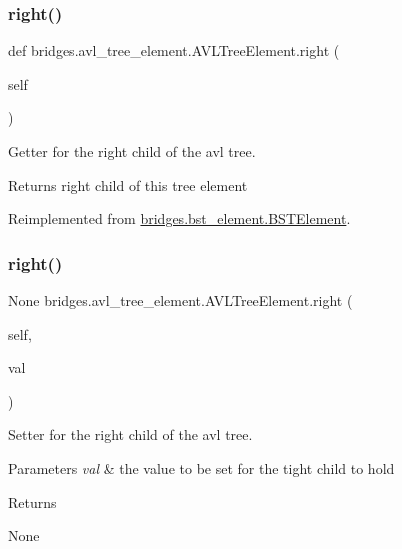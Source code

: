 \subsubsection{\texorpdfstring{right()}{right()}\hspace{0.1cm}{\footnotesize\ttfamily [1/2]}}
{\footnotesize\ttfamily def bridges.\+avl\+\_\+tree\+\_\+element.\+A\+V\+L\+Tree\+Element.\+right (\begin{DoxyParamCaption}\item[{}]{self }\end{DoxyParamCaption})}



Getter for the right child of the avl tree. 

\begin{DoxyReturn}{Returns}
right child of this tree element 
\end{DoxyReturn}


Reimplemented from \mbox{\hyperlink{classbridges_1_1bst__element_1_1_b_s_t_element_a3ec82fbc56a5e6309b69d2d963b483fd}{bridges.\+bst\+\_\+element.\+B\+S\+T\+Element}}.

\mbox{\label{classbridges_1_1avl__tree__element_1_1_a_v_l_tree_element_a5aa36d46b0c6ac791893823500c77a08}} 
\subsubsection{\texorpdfstring{right()}{right()}\hspace{0.1cm}{\footnotesize\ttfamily [2/2]}}
{\footnotesize\ttfamily  None bridges.\+avl\+\_\+tree\+\_\+element.\+A\+V\+L\+Tree\+Element.\+right (\begin{DoxyParamCaption}\item[{}]{self,  }\item[{}]{val }\end{DoxyParamCaption})}



Setter for the right child of the avl tree. 


\begin{DoxyParams}{Parameters}
{\em val} & the value to be set for the tight child to hold \\
\hline
\end{DoxyParams}
\begin{DoxyReturn}{Returns}


None 
\end{DoxyReturn}


